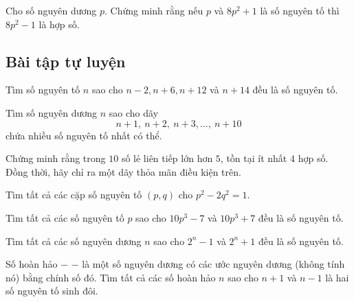\begin{bx}
Cho số nguyên dương $p.$ Chứng minh rằng nếu $p$ và $8p^2+1$ là số nguyên tố thì $8p^2-1$ là hợp số.
\end{bx}

\subsection{Bài tập tự luyện}

\begin{btt}
Tìm số nguyên tố $n$ sao cho $n-2,n+6,n+12$ và $n+14$  đều là số nguyên tố.
\end{btt}

\begin{btt}
Tìm số nguyên dương $n$ sao cho dãy 
$$n+1, \:n+2,\:n+3,\ldots,\:n+10$$ chứa nhiều số nguyên tố nhất có thể.
\end{btt}

\begin{btt}
Chứng minh rằng trong $10$ số lẻ liên tiếp lớn hơn $5$, tồn tại ít nhất $4$ hợp số. Đồng thời, hãy chỉ ra một dãy thỏa mãn điều kiện trên.
\end{btt}

\begin{btt}
Tìm tất cả các cặp số nguyên tố $(p,q)$ cho $p^2-2q^2=1.$
\end{btt}

\begin{btt}
Tìm tất cả các số nguyên tố $p$ sao cho $10p^3-7$ và $10p^3+7$ đều là số nguyên tố.
\end{btt}

\begin{btt}
Tìm tất cả các số nguyên dương $n$ sao cho $2^n-1$ và $2^n+1$ đều là số nguyên tố. 
\end{btt}

\begin{btt}
Số hoàn hảo $-$  $-$ là một số nguyên dương có các ước nguyên dương (không tính nó) bằng chính số đó. Tìm tất cả các số hoàn hảo $n$ sao cho $n+1$ và $n-1$ là hai số nguyên tố sinh đôi.
\end{btt}

